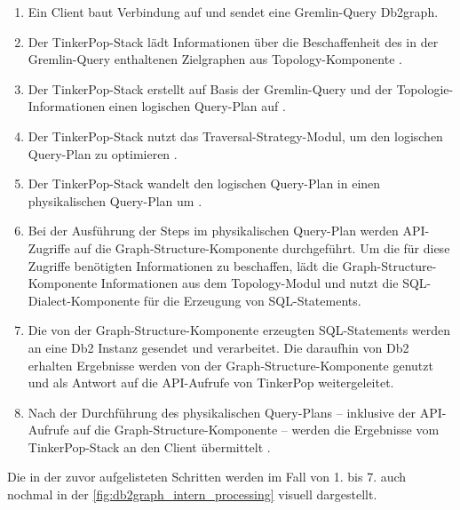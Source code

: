 \begin{enumerate}
    \item Ein Client baut Verbindung auf und sendet eine Gremlin-Query Db2graph.
    \item Der TinkerPop-Stack lädt Informationen über die Beschaffenheit des in der Gremlin-Query enthaltenen Zielgraphen aus Topology-Komponente \cite{vldb_tian,sigmod_tian, yt_tian}.
    \item Der TinkerPop-Stack erstellt auf Basis der Gremlin-Query und der Topologie-Informationen einen logischen Query-Plan auf \cite{vldb_tian,sigmod_tian, yt_tian}. 
    \item Der TinkerPop-Stack nutzt das Traversal-Strategy-Modul, um den logischen Query-Plan zu optimieren \cite{vldb_tian,sigmod_tian, yt_tian}.
    \item Der TinkerPop-Stack wandelt den logischen Query-Plan in einen physikalischen Query-Plan um \cite{vldb_tian,sigmod_tian, yt_tian}. 
    \item Bei der Ausführung der Steps im physikalischen Query-Plan werden API-Zugriffe auf die Graph-Structure-Komponente durchgeführt. Um die für diese Zugriffe benötigten Informationen zu beschaffen, lädt die Graph-Structure-Komponente Informationen aus dem Topology-Modul und nutzt die SQL-Dialect-Komponente für die Erzeugung von SQL-Statements. \cite{vldb_tian,sigmod_tian, yt_tian} 
    \item Die von der Graph-Structure-Komponente erzeugten SQL-Statements werden an eine Db2 Instanz gesendet und verarbeitet. Die daraufhin von Db2 erhalten Ergebnisse werden von der Graph-Structure-Komponente genutzt und als Antwort auf die API-Aufrufe von TinkerPop weitergeleitet. \cite{vldb_tian,sigmod_tian, yt_tian} 
    \item Nach der Durchführung des physikalischen Query-Plans -- inklusive der API-Aufrufe auf die Graph-Structure-Komponente -- werden die Ergebnisse vom TinkerPop-Stack an den Client übermittelt \cite{vldb_tian,sigmod_tian, yt_tian}.
\end{enumerate}

Die in der zuvor aufgelisteten Schritten werden im Fall von 1. bis 7. auch nochmal in der \autoref{fig:db2graph_intern_processing} visuell dargestellt.

